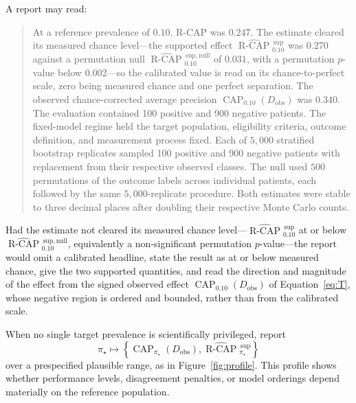 \documentclass[11pt]{article}
\newcommand{\CAP}{\operatorname{CAP}}
\newcommand{\Tpi}{\CAP_{\pi_\star}}
\newcommand{\RCAPHat}{\widehat{\operatorname{R\text{-}CAP}}{}^{\,\mathrm{sup}}_{\pi_\star}}
\theoremstyle{remark}
\begin{document}
A report may read:
\begin{quote}
At a reference prevalence of $0.10$, R-CAP was $0.247$. The estimate cleared its measured chance level---the supported effect $\widehat{\operatorname{R\text{-}CAP}}{}^{\,\mathrm{sup}}_{0.10}$ was $0.270$ against a permutation null $\widehat{\operatorname{R\text{-}CAP}}{}^{\,\mathrm{sup,null}}_{0.10}$ of $0.031$, with a permutation $p$-value below $0.002$---so the calibrated value is read on its chance-to-perfect scale, zero being measured chance and one perfect separation. The observed chance-corrected average precision $\CAP_{0.10}(D_{\mathrm{obs}})$ was $0.340$. The evaluation contained 100 positive and 900 negative patients. The fixed-model regime held the target population, eligibility criteria, outcome definition, and measurement process fixed. Each of $5{,}000$ stratified bootstrap replicates sampled 100 positive and 900 negative patients with replacement from their respective observed classes. The null used $500$ permutations of the outcome labels across individual patients, each followed by the same $5{,}000$-replicate procedure. Both estimates were stable to three decimal places after doubling their respective Monte Carlo counts.
\end{quote}

Had the estimate not cleared its measured chance level---$\widehat{\operatorname{R\text{-}CAP}}{}^{\,\mathrm{sup}}_{0.10}$ at or below $\widehat{\operatorname{R\text{-}CAP}}{}^{\,\mathrm{sup,null}}_{0.10}$, equivalently a non-significant permutation $p$-value---the report would omit a calibrated headline, state the result as at or below measured chance, give the two supported quantities, and read the direction and magnitude of the effect from the signed observed effect $\CAP_{0.10}(D_{\mathrm{obs}})$ of Equation~\eqref{eq:T}, whose negative region is ordered and bounded, rather than from the calibrated scale.

When no single target prevalence is scientifically privileged, report
\[
\pi_\star
\longmapsto
\left\{
\Tpi(D_{\mathrm{obs}}),
\RCAPHat
\right\}
\]
over a prespecified plausible range, as in Figure~\ref{fig:profile}. This profile shows whether performance levels, disagreement penalties, or model orderings depend materially on the reference population.
\end{document}
